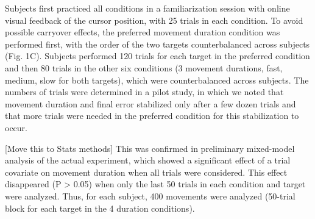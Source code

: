 Subjects first practiced all conditions in a familiarization session with online visual feedback of the cursor position, with 25 trials in each condition. 
To avoid possible carryover effects, the preferred movement duration condition was performed first, with the order of the two targets counterbalanced across subjects (Fig. 1C). 
Subjects performed 120 trials for each target in the preferred condition and then 80 trials in the other six conditions (3 movement durations, fast, medium, slow for both targets), which were counterbalanced across subjects. 
The numbers of trials were determined in a pilot study, in which we noted that movement duration and final error stabilized only after a few dozen trials and that more trials were needed in the preferred condition for this stabilization to occur. 

[Move this to Stats methods] This was confirmed in preliminary mixed-model analysis of the actual experiment, which showed a significant effect of a trial covariate on movement duration when all trials were considered. This effect disappeared (P > 0.05) when only the last 50 trials in each condition and target were analyzed. Thus, for each subject, 400 movements were analyzed (50-trial block for each target in the 4 duration conditions).